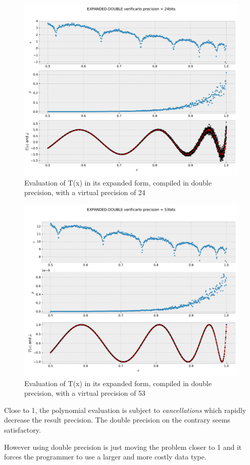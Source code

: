 \documentclass{TP}
\begin{document}
\begin{figure}[h]
\center \includegraphics[width=.8\textwidth]{EXPANDED-DOUBLE-24.pdf}
  \caption{Evaluation of T(x) in its expanded form, compiled in double precision, with a virtual precision of 24}
  \label{fig:expanded:double:24}
\end{figure}
\begin{figure}[h]
\center \includegraphics[width=.8\textwidth]{EXPANDED-DOUBLE-53.pdf}
  \caption{Evaluation of T(x) in its expanded form, compiled in double precision, with a virtual precision of 53}
  \label{fig:expanded:double:53}
\end{figure}

Close to 1, the polynomial evaluation is subject to {\it cancellations} which rapidly decrease the result precision. The double precision on the contrary seems satisfactory.

However using double precision is just moving the problem closer to 1 and it forces the programmer to use a larger and more costly data type.
\end{document}
